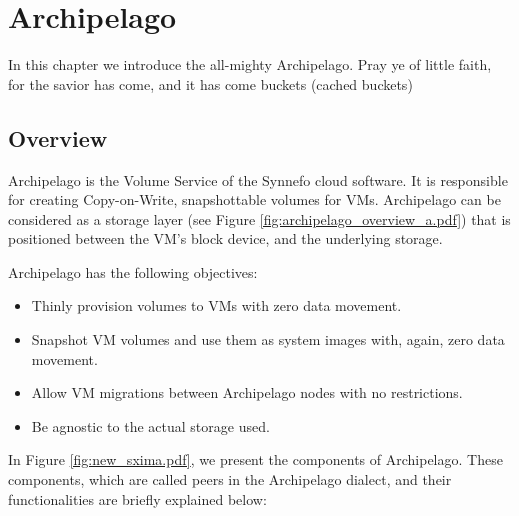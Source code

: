 \chapter{Archipelago}\label{ch:theory}

In this chapter we introduce the all-mighty Archipelago. Pray ye of little 
faith, for the savior has come, and it has come buckets (cached buckets)

\section{Overview}

Archipelago is the Volume Service of the Synnefo cloud software. It is 
responsible for creating Copy-on-Write, snapshottable volumes for VMs.  
Archipelago can be considered as a storage layer (see Figure 
\ref{fig:archipelago_overview_a.pdf}) that is positioned between the VM's block 
device, and the underlying storage.


Archipelago has the following objectives:

\begin{itemize}
	\item Thinly provision volumes to VMs with zero data movement.
	\item Snapshot VM volumes and use them as system images with, again, zero 
		data movement.
	\item Allow VM migrations between Archipelago nodes with no restrictions.
	\item Be agnostic to the actual storage used.
\end{itemize}
	
In Figure \ref{fig:new_sxima.pdf}, we present the components of Archipelago.  
These components, which are called peers in the Archipelago dialect, and their 
functionalities are briefly explained below:


